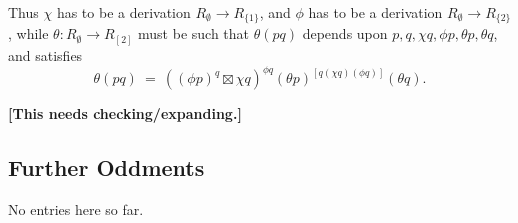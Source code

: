 \noindent
Thus $\chi$ has to be a derivation $R_{\emptyset} \to R_{\{1\}}$, 
and $\phi$ has to be a derivation $R_{\emptyset} \to R_{\{2\}}$, 
while $\theta : R_{\emptyset} \to R_{[2]}$  must be such that $\theta(pq)$
depends upon $p,q,\chi q,\phi p, \theta p, \theta q$, 
and satisfies 
$$
\theta(pq) ~=~ ((\phi p)^q \boxtimes \chi q)^{\phi q} 
                (\theta p)^{[q (\chi q)(\phi q)]} (\theta q).
$$

\bigskip\noindent
{\bf [This needs checking/expanding.]}



\vspace*{15mm}
\subsection{Further Oddments}

No entries here so far.


